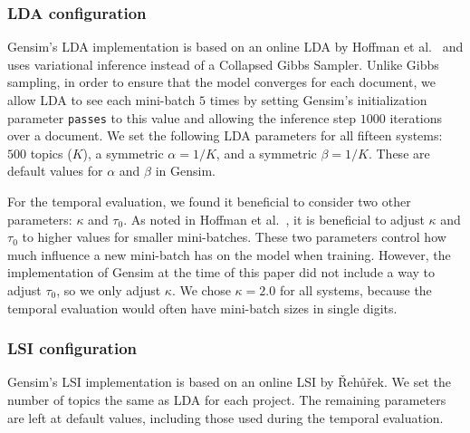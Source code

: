 \subsubsection{LDA configuration}

Gensim's LDA implementation is based on an online LDA by Hoffman et al.~\cite{Hoffman-etal:2010}
and uses variational inference instead of a Collapsed Gibbs Sampler.
Unlike Gibbs sampling, in order to ensure that the model converges for each document,
we allow LDA to see each mini-batch $5$ times by setting Gensim's initialization parameter \texttt{passes} to this value
and allowing the inference step $1000$ iterations over a document.
We set the following LDA parameters for all fifteen systems:
$500$ topics ($K$), a symmetric $\alpha=1/K$, and a symmetric $\beta=1/K$.
These are default values for $\alpha$ and $\beta$ in Gensim.

For the temporal evaluation, we found it beneficial to consider two other parameters: $\kappa$ and $\tau_0$.
As noted in Hoffman et al.~\cite{Hoffman-etal:2010}, it is beneficial to
adjust $\kappa$ and $\tau_0$ to higher values for smaller mini-batches.
These two parameters control how much influence a new mini-batch has on the model when training.
However, the implementation of Gensim at the time of this paper did not
include a way to adjust $\tau_0$, so we only adjust $\kappa$.
We chose $\kappa=2.0$ for all systems, because the temporal evaluation
would often have mini-batch sizes in single digits.

\subsubsection{LSI configuration}

Gensim's LSI implementation is based on an online LSI by {\v R}eh{\r u}{\v r}ek\cite{Radim:2011}.
We set the number of topics the same as LDA for each project.
The remaining parameters are left at default values, including those used
during the temporal evaluation.

